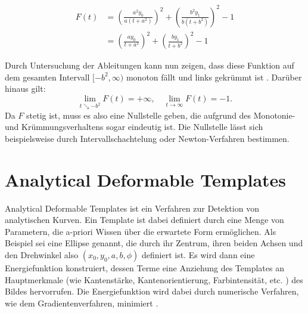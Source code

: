 \begin{enumerate}
\[
	\begin{aligned}
		F(t) &= \left(\frac{a^2y_0}{a\left(t+a^2\right)}\right)^2 + \left(\frac{b^2y_1}{b\left(t+b^2\right)}\right)^2 - 1 \\
		&= \left(\frac{ay_0}{t+a^2}\right)^2 + \left(\frac{by_1}{t+b^2}\right)^2 - 1
	\end{aligned}
\]
	
	Durch Untersuchung der Ableitungen kann nun zeigen, dass diese Funktion auf dem gesamten Intervall $[-b^2,\infty)$ monoton fällt und links gekrümmt ist \cite{Eberly2013}. Darüber hinaus gilt:
	\[
	\lim\limits_{t \searrow -b^2}{F(t)}	= +\infty, \quad\lim\limits_{t \rightarrow \infty}{F(t)}	= -1.
	\]
	Da $F$ stetig ist, muss es also eine Nullstelle geben, die aufgrund des Monotonie- und Krümmungsverhaltens sogar eindeutig ist. Die Nullstelle lässt sich beispielsweise durch Intervallschachtelung oder Newton-Verfahren bestimmen. 
\end{enumerate}


\section{Analytical Deformable Templates}
\label{s:anaDef}
Analytical Deformable Templates ist ein Verfahren zur Detektion von analytischen Kurven. 
Ein Template ist dabei definiert durch eine Menge von Parametern, die a-priori Wissen über die erwartete Form ermöglichen. 
Als Beispiel sei eine  Ellipse genannt, die durch ihr Zentrum, ihren beiden Achsen und den Drehwinkel also $(x_0,y_0,a,b,\phi)$ definiert ist.
Es wird dann eine Energiefunktion konstruiert, dessen Terme eine Anziehung des Templates an Hauptmerkmale (wie Kantenstärke, Kantenorientierung, Farbintensität, etc. ) des Bildes hervorrufen. 
Die Energiefunktion wird dabei durch numerische Verfahren, wie dem Gradientenverfahren, minimiert \cite{Yuille1992}. 







